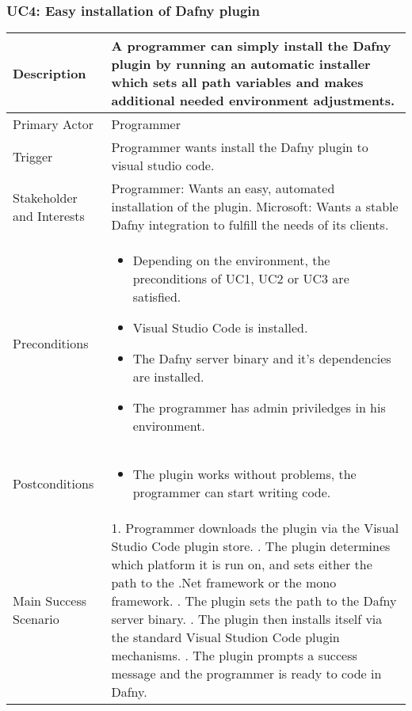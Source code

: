 \subsubsection{UC4: Easy installation of Dafny plugin}
\begin{longtable}{l | p{} }
	Description & A programmer can simply install the Dafny plugin by running an automatic installer which sets all path variables and makes additional needed environment adjustments.\\ \hline
	Primary Actor & Programmer\\ \hline
	Trigger & Programmer wants install the Dafny plugin to visual studio code.\\ \hline
	Stakeholder and Interests & Programmer: Wants an easy, automated installation of the plugin. \newline Microsoft: Wants a stable Dafny integration to fulfill the needs of its clients.\\ \hline
	Preconditions &\begin{itemize}
		\item Depending on the environment, the preconditions of UC1, UC2 or UC3 are satisfied.
		\item Visual Studio Code is installed.
		\item The Dafny server binary and it's dependencies are installed.
		\item The programmer has admin priviledges in his environment.
	\end{itemize}\\ \hline
	Postconditions & 
	\begin{itemize}
		\item The plugin works without problems, the programmer can start writing code.
	\end{itemize} \\ \hline
	Main Success Scenario & 
	1. Programmer downloads the plugin via the Visual Studio Code plugin store. \newline
	2. The plugin determines which platform it is run on, and sets either the path to the .Net framework or the mono framework. \newline
	3. The plugin sets the path to the Dafny server binary. \newline
	4. The plugin then installs itself via the standard Visual Studion Code plugin mechanisms. \newline
	5. The plugin prompts a success message and the programmer is ready to code in Dafny.\\ \hline

\end{longtable}

